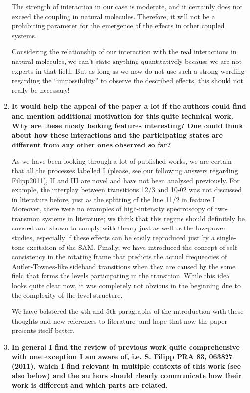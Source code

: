 \documentclass{article}
\begin{document}
\begin{enumerate}
	The strength of interaction in our case is moderate, and it certainly does not exceed the coupling in natural molecules. Therefore, it will not be a prohibiting parameter for the emergence of the effects in other coupled systems.
	
	Considering the relationship of our interaction with the real interactions in natural molecules, we can't state anything quantitatively because we are not experts in that field. But as long as we now do not use such a strong wording regarding the ``impossibility'' to observe the described effects, this should not really be necessary!
	
	\item \textbf{ It would help the appeal of the paper a lot if the authors could
	find and mention additional motivation for this quite technical work.
	Why are these nicely looking features interesting? One could think
	about how these interactions and the participating states are
	different from any other ones observed so far?}
	
	As we have been looking through a lot of published works, we are certain that all the processes labelled I (please, see our following answers regarding Filipp2011), II and III are novel and have not been analysed previously. For example, the interplay between transitions 12/3 and 10-02 was not discussed in literature before, just as the splitting of the line 11/2 in feature I. Moreover, there were no examples of high-intensity spectroscopy of two-transmon systems in literature; we think that this regime should definitely be covered and shown to comply with theory just as well as the low-power studies, especially if these effects can be easily reproduced just by a single-tone excitation of the SAM. Finally, we have introduced the concept of self-consistency in the rotating frame that predicts the actual frequencies of Autler-Townes-like sideband transitions when they are caused by the same field that forms the levels participating in the transition. While this idea looks quite clear now, it was completely not obvious in the beginning due to the complexity of the level structure.
	
	We have bolstered the 4th and 5th paragraphs of the introduction with these thoughts and new references to literature, and hope that now the paper presents itself better.
	
	\item \textbf{In general I find the review of previous work quite comprehensive with
	one exception I am aware of, i.e. S. Filipp PRA 83, 063827 (2011),
	which I find relevant in multiple contexts of this work (see also
	below) and the authors should clearly communicate how their work is
	different and which parts are related.}


\end{enumerate}
\end{document}
